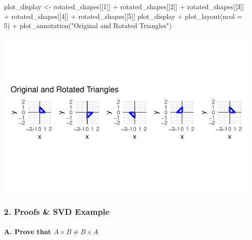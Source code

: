 \documentclass[
  letterpaper,
  DIV=11,
  numbers=noendperiod]{scrartcl}
\let\oldparagraph\paragraph
\renewcommand{\paragraph}[1]{\oldparagraph{#1}\mbox{}}
\newenvironment{Shaded}{\begin{snugshade}}{\end{snugshade}}
\newcommand{\AttributeTok}[1]{\textcolor[rgb]{0.40,0.45,0.13}{#1}}
\newcommand{\DecValTok}[1]{\textcolor[rgb]{0.68,0.00,0.00}{#1}}
\newcommand{\FunctionTok}[1]{\textcolor[rgb]{0.28,0.35,0.67}{#1}}
\newcommand{\NormalTok}[1]{\textcolor[rgb]{0.00,0.23,0.31}{#1}}
\newcommand{\OtherTok}[1]{\textcolor[rgb]{0.00,0.23,0.31}{#1}}
\newcommand{\SpecialCharTok}[1]{\textcolor[rgb]{0.37,0.37,0.37}{#1}}
\newcommand{\StringTok}[1]{\textcolor[rgb]{0.13,0.47,0.30}{#1}}
\begin{document}
\begin{Shaded}
\begin{Highlighting}[]
\NormalTok{plot\_display }\OtherTok{\textless{}{-}}\NormalTok{ rotated\_shapes[[}\DecValTok{1}\NormalTok{]] }\SpecialCharTok{+}
\NormalTok{                rotated\_shapes[[}\DecValTok{2}\NormalTok{]] }\SpecialCharTok{+}
\NormalTok{                rotated\_shapes[[}\DecValTok{3}\NormalTok{]] }\SpecialCharTok{+}
\NormalTok{                rotated\_shapes[[}\DecValTok{4}\NormalTok{]] }\SpecialCharTok{+}
\NormalTok{                rotated\_shapes[[}\DecValTok{5}\NormalTok{]]}
\NormalTok{plot\_display }\SpecialCharTok{+} 
  \FunctionTok{plot\_layout}\NormalTok{(}\AttributeTok{ncol =} \DecValTok{5}\NormalTok{) }\SpecialCharTok{+}
  \FunctionTok{plot\_annotation}\NormalTok{(}\StringTok{"Original and Rotated Triangles"}\NormalTok{)}
\end{Highlighting}
\end{Shaded}

\includegraphics{Assignment-1---Fox_files/figure-pdf/rotate_static-1.pdf}

\subsubsection{2. Proofs \& SVD Example}\label{proofs-svd-example}

\paragraph{\texorpdfstring{A. Prove that
\(A \times B \neq B \times A\)}{A. Prove that A \textbackslash times B \textbackslash neq B \textbackslash times A}}\label{a.-prove-that-a-times-b-neq-b-times-a}
\end{document}
